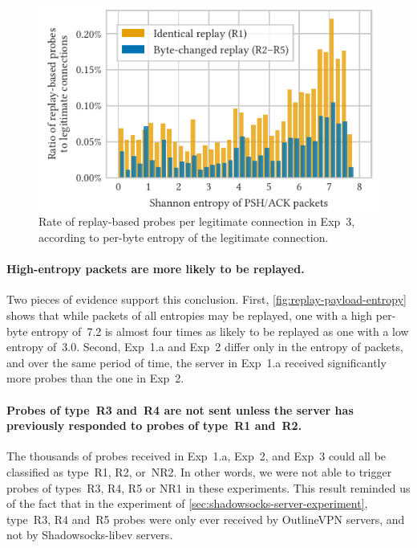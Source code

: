 \documentclass[sigconf,letterpaper]{acmart}
\begin{document}
\begin{figure}
    \includegraphics{figures/replayed_ratio_exp3.pdf}
    \caption{
    Rate of replay-based probes per legitimate connection in Exp~3,
    according to per-byte entropy of the legitimate connection.
    }
    \label{fig:replay-payload-entropy}
\end{figure}

\paragraph{High-entropy packets are more likely to be replayed.}
Two pieces of evidence support this conclusion.
First,
\autoref{fig:replay-payload-entropy} shows that
while packets of all entropies may be replayed,
one with a high per-byte entropy of~7.2 is almost four times as likely
to be replayed as one with a low entropy of~3.0.
Second,
Exp~1.a and Exp~2 differ only in the entropy of packets,
and over the same period of time,
the server in Exp~1.a received significantly more probes than the one in Exp~2.

\paragraph{Probes of type~R3 and~R4 are not sent unless the server has previously responded to probes of type~R1 and~R2.}
The thousands of probes received in Exp~1.a, Exp~2, and Exp~3
could all be classified as type~R1, R2, or~NR2.
In other words,
we were not able to trigger probes of types~R3, R4, R5 or NR1 in these experiments.
This result reminded us of the fact that in the experiment of \autoref{sec:shadowsocks-server-experiment},
type~R3, R4 and~R5 probes
were only ever received by OutlineVPN servers,
and not by Shadowsocks-libev servers.
\end{document}
